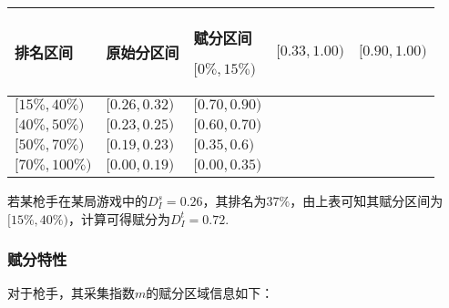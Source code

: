 \documentclass{ctexart}
\begin{document}
\begin{longtable}{|>{\centering\arraybackslash}p{6em}|>{\centering\arraybackslash}p{6em}|>{\centering\arraybackslash}p{6em}|}
    \hline

    排名区间             & 原始分区间  & 赋分区间     \endhead

    \hline

    $[0\%, 15\%)$ & $[0.33, 1.00)$  & $[0.90, 1.00)$          \\

    \hline

    $[15\%, 40\%)$  & $[0.26, 0.32)$ & $[0.70, 0.90)$          \\

    \hline

    $[40\%, 50\%)$   & $[0.23, 0.25)$ & $[0.60, 0.70)$          \\

    \hline

    $[50\%, 70\%)$    & $[0.19, 0.23)$ & $[0.35, 0.6)$          \\

    \hline

    $[70\%, 100\%)$    & $[0.00, 0.19)$ & $[0.00, 0.35)$          \\

    \hline

\end{longtable}

若某枪手在某局游戏中的$D_I^s = 0.26$，其排名为$37\%$，由上表可知其赋分区间为$[15\%, 40\%)$，计算可得赋分为$D_I^t = 0.72$.

\subsubsection{赋分特性}

对于枪手，其采集指数$m$的赋分区域信息如下：
\end{document}
